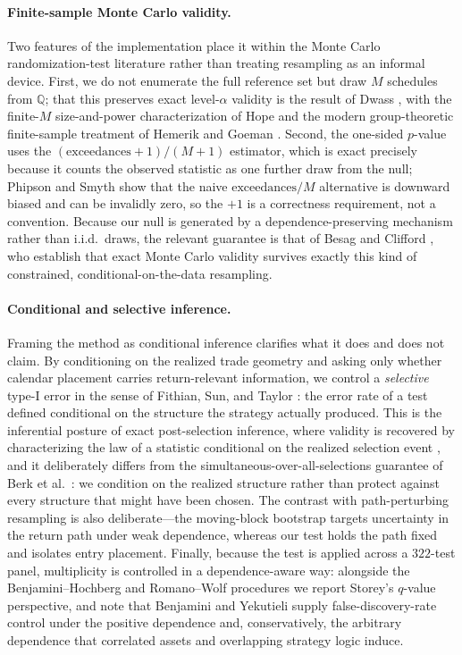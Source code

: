 \documentclass[preprint,12pt]{elsarticle}
\theoremstyle{definition}
\begin{document}
\paragraph{Finite-sample Monte Carlo validity.} Two features of the implementation place it within the Monte Carlo randomization-test literature rather than treating resampling as an informal device. First, we do not enumerate the full reference set but draw $M$ schedules from $\mathbb{Q}$; that this preserves exact level-$\alpha$ validity is the result of Dwass \cite{Dwass1957}, with the finite-$M$ size-and-power characterization of Hope \cite{Hope1968} and the modern group-theoretic finite-sample treatment of Hemerik and Goeman \cite{HemerikGoeman2018}. Second, the one-sided $p$-value uses the $(\text{exceedances}+1)/(M+1)$ estimator, which is exact precisely because it counts the observed statistic as one further draw from the null; Phipson and Smyth \cite{PhipsonSmyth2010} show that the naive $\text{exceedances}/M$ alternative is downward biased and can be invalidly zero, so the $+1$ is a correctness requirement, not a convention. Because our null is generated by a dependence-preserving mechanism rather than i.i.d.\ draws, the relevant guarantee is that of Besag and Clifford \cite{BesagClifford1989}, who establish that exact Monte Carlo validity survives exactly this kind of constrained, conditional-on-the-data resampling.

\paragraph{Conditional and selective inference.} Framing the method as conditional inference clarifies what it does and does not claim. By conditioning on the realized trade geometry and asking only whether calendar placement carries return-relevant information, we control a \emph{selective} type-I error in the sense of Fithian, Sun, and Taylor \cite{FithianSunTaylor2014}: the error rate of a test defined conditional on the structure the strategy actually produced. This is the inferential posture of exact post-selection inference, where validity is recovered by characterizing the law of a statistic conditional on the realized selection event \cite{LeeSunSunTaylor2016}, and it deliberately differs from the simultaneous-over-all-selections guarantee of Berk et al.\ \cite{BerkBrownBujaZhangZhao2013}: we condition on the realized structure rather than protect against every structure that might have been chosen. The contrast with path-perturbing resampling is also deliberate---the moving-block bootstrap \cite{Kunsch1989} targets uncertainty in the return path under weak dependence, whereas our test holds the path fixed and isolates entry placement. Finally, because the test is applied across a $322$-test panel, multiplicity is controlled in a dependence-aware way: alongside the Benjamini--Hochberg \cite{benjaminihochberg1995} and Romano--Wolf \cite{romanowolf2005} procedures we report Storey's \cite{Storey2002} $q$-value perspective, and note that Benjamini and Yekutieli \cite{BenjaminiYekutieli2001} supply false-discovery-rate control under the positive dependence and, conservatively, the arbitrary dependence that correlated assets and overlapping strategy logic induce.
\end{document}
